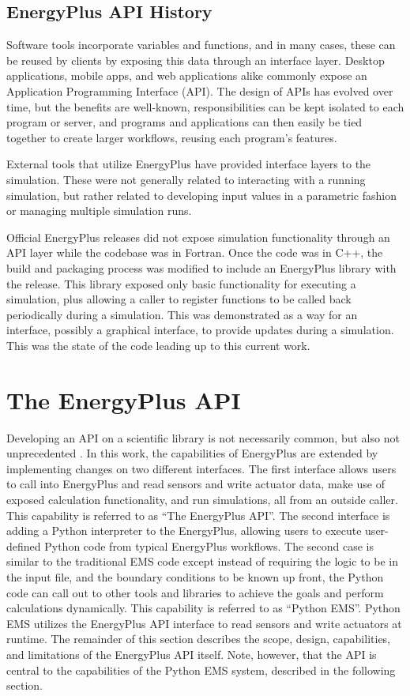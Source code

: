 \documentclass[5p]{elsarticle}
\begin{document}
  \subsection{EnergyPlus API History}
Software tools incorporate variables and functions, and in many cases, these can be reused by clients by exposing this data through an interface layer.  Desktop applications, mobile apps, and web applications alike commonly expose an Application Programming Interface (API).  The design of APIs has evolved over time, but the benefits are well-known, responsibilities can be kept isolated to each program or server, and programs and applications can then easily be tied together to create larger workflows, reusing each program’s features.

External tools that utilize EnergyPlus have provided interface layers to the simulation. \cite{Campos2020}  These were not generally related to interacting with a running simulation, but rather related to developing input values in a parametric fashion or managing multiple simulation runs.

Official EnergyPlus releases did not expose simulation functionality through an API layer while the codebase was in Fortran.  Once the code was in C++, the build and packaging process was modified to include an EnergyPlus library with the release.  This library exposed only basic functionality for executing a simulation, plus allowing a caller to register functions to be called back periodically during a simulation.  This was demonstrated as a way for an interface, possibly a graphical interface, to provide updates during a simulation.  This was the state of the code leading up to this current work.

 \section{The EnergyPlus API} 
Developing an API on a scientific library is not necessarily common, but also not unprecedented \cite{Mohanan2018}.  In this work, the capabilities of EnergyPlus are extended by implementing changes on two different interfaces.  The first interface allows users to call into EnergyPlus and read sensors and write actuator data, make use of exposed calculation functionality, and run simulations, all from an outside caller.  This capability is referred to as “The EnergyPlus API”.  The second interface is adding a Python interpreter to the EnergyPlus, allowing users to execute user-defined Python code from typical EnergyPlus workflows.  The second case is similar to the traditional EMS code except instead of requiring the logic to be in the input file, and the boundary conditions to be known up front, the Python code can call out to other tools and libraries to achieve the goals and perform calculations dynamically.  This capability is referred to as “Python EMS”.  Python EMS utilizes the EnergyPlus API interface to read sensors and write actuators at runtime.  The remainder of this section describes the scope, design, capabilities, and limitations of the EnergyPlus API itself. Note, however, that the API is central to the capabilities of the Python EMS system, described in the following section.
 
\end{document}
